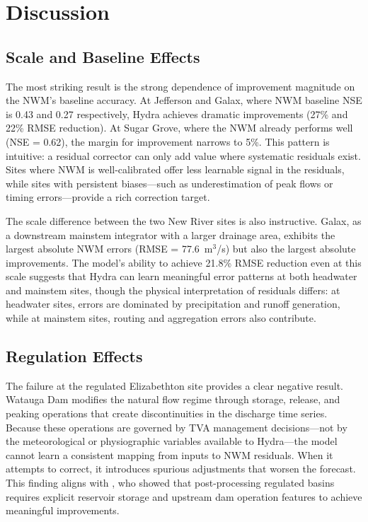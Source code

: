\documentclass[draft]{agujournal2019}
\begin{document}
\section{Discussion}

\subsection{Scale and Baseline Effects}

The most striking result is the strong dependence of improvement magnitude on the NWM's baseline accuracy. At Jefferson and Galax, where NWM baseline NSE is 0.43 and 0.27 respectively, Hydra achieves dramatic improvements (27\% and 22\% RMSE reduction). At Sugar Grove, where the NWM already performs well (NSE = 0.62), the margin for improvement narrows to 5\%. This pattern is intuitive: a residual corrector can only add value where systematic residuals exist. Sites where NWM is well-calibrated offer less learnable signal in the residuals, while sites with persistent biases---such as underestimation of peak flows or timing errors---provide a rich correction target.

The scale difference between the two New River sites is also instructive. Galax, as a downstream mainstem integrator with a larger drainage area, exhibits the largest absolute NWM errors (RMSE = 77.6~m$^3$/s) but also the largest absolute improvements. The model's ability to achieve 21.8\% RMSE reduction even at this scale suggests that Hydra can learn meaningful error patterns at both headwater and mainstem sites, though the physical interpretation of residuals differs: at headwater sites, errors are dominated by precipitation and runoff generation, while at mainstem sites, routing and aggregation errors also contribute.

\subsection{Regulation Effects}

The failure at the regulated Elizabethton site provides a clear negative result. Watauga Dam modifies the natural flow regime through storage, release, and peaking operations that create discontinuities in the discharge time series. Because these operations are governed by TVA management decisions---not by the meteorological or physiographic variables available to Hydra---the model cannot learn a consistent mapping from inputs to NWM residuals. When it attempts to correct, it introduces spurious adjustments that worsen the forecast. This finding aligns with , who showed that post-processing regulated basins requires explicit reservoir storage and upstream dam operation features to achieve meaningful improvements.
\end{document}
